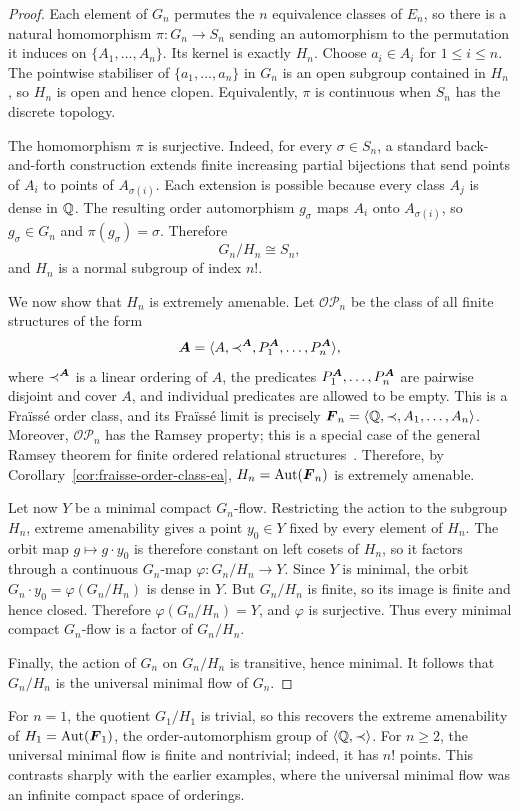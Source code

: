 \begin{proof}
Each element of \(G_n\) permutes the \(n\) equivalence classes of \(E_n\), so there is a natural homomorphism \(\pi\colon G_n\to S_n\) sending an automorphism to the permutation it induces on \(\{A_1,\dots,A_n\}\). Its kernel is exactly \(H_n\). Choose \(a_i\in A_i\) for \(1\leq i\leq n\). The pointwise stabiliser of \(\{a_1,\dots,a_n\}\) in \(G_n\) is an open subgroup contained in \(H_n\), so \(H_n\) is open and hence clopen. Equivalently, \(\pi\) is continuous when \(S_n\) has the discrete topology.

The homomorphism \(\pi\) is surjective. Indeed, for every \(\sigma\in S_n\), a standard back-and-forth construction extends finite increasing partial bijections that send points of \(A_i\) to points of \(A_{\sigma(i)}\). Each extension is possible because every class \(A_j\) is dense in \(\mathbb{Q}\). The resulting order automorphism \(g_\sigma\) maps \(A_i\) onto \(A_{\sigma(i)}\), so \(g_\sigma\in G_n\) and \(\pi(g_\sigma)=\sigma\). Therefore
\[
G_n/H_n\cong S_n,
\]
and \(H_n\) is a normal subgroup of index \(n!\).

We now show that \(H_n\) is extremely amenable. Let \(\mathcal{OP}_n\) be the class of all finite structures of the form
\[
\boldsymbol{A}=\langle A,\prec^{\boldsymbol{A}},P_1^{\boldsymbol{A}},\dots,P_n^{\boldsymbol{A}}\rangle,
\]
where \(\prec^{\boldsymbol{A}}\) is a linear ordering of \(A\), the predicates \(P_1^{\boldsymbol{A}},\dots,P_n^{\boldsymbol{A}}\) are pairwise disjoint and cover \(A\), and individual predicates are allowed to be empty. This is a Fraïssé order class, and its Fraïssé limit is precisely \(\boldsymbol{F}_n=\langle \mathbb{Q},\prec,A_1,\dots,A_n\rangle\).
Moreover, \(\mathcal{OP}_n\) has the Ramsey property; this is a special case of the general Ramsey theorem for finite ordered relational structures~\cite{NR77,NR83}. Therefore, by Corollary~\ref{cor:fraisse-order-class-ea}, \(H_n=\operatorname{Aut}(\boldsymbol{F}_n)\) is extremely amenable.

Let now \(Y\) be a minimal compact \(G_n\)-flow. Restricting the action to the subgroup \(H_n\), extreme amenability gives a point \(y_0\in Y\) fixed by every element of \(H_n\). The orbit map \(g\mapsto g\cdot y_0\) is therefore constant on left cosets of \(H_n\), so it factors through a continuous \(G_n\)-map \(\varphi\colon G_n/H_n\to Y\).
Since \(Y\) is minimal, the orbit \(G_n\cdot y_0=\varphi(G_n/H_n)\) is dense in \(Y\). But \(G_n/H_n\) is finite, so its image is finite and hence closed. Therefore \(\varphi(G_n/H_n)=Y\),
and \(\varphi\) is surjective. Thus every minimal compact \(G_n\)-flow is a factor of \(G_n/H_n\).

Finally, the action of \(G_n\) on \(G_n/H_n\) is transitive, hence minimal. It follows that \(G_n/H_n\) is the universal minimal flow of \(G_n\).
\end{proof}

For \(n=1\), the quotient \(G_1/H_1\) is trivial, so this recovers the extreme amenability of \(H_1=\operatorname{Aut}(\boldsymbol{F}_1)\), the order-automorphism group of \(\langle\mathbb{Q},\prec\rangle\). For \(n\geq 2\), the universal minimal flow is finite and nontrivial; indeed, it has \(n!\) points. This contrasts sharply with the earlier examples, where the universal minimal flow was an infinite compact space of orderings.
